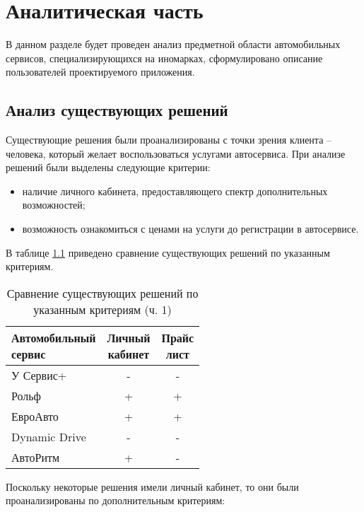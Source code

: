 \chapter{Аналитическая часть}

В данном разделе будет проведен анализ предметной области автомобильных сервисов, специализирующихся на иномарках, сформулировано описание пользователей проектируемого приложения.

\section{Анализ существующих решений}

Существующие решения были проанализированы с точки зрения клиента -- человека, который желает воспользоваться услугами автосервиса. При анализе решений были выделены следующие критерии:

\begin{itemize}
	\item наличие личного кабинета, предоставляющего спектр дополнительных возможностей;
	\item возможность ознакомиться с ценами на услуги до регистрации в автосервисе.
\end{itemize}

В таблице \ref{tab:compare1} приведено сравнение существующих решений по указанным критериям.

\begin{table}[H]
	\centering
	\caption{\label{tab:compare1}Сравнение существующих решений по указанным критериям (ч. 1)}
	\begin{tabular}{|l|c|c|}
		\hline \specialcell{Автомобильный\\сервис} & \specialcell{Личный\\кабинет} &
		\specialcell{Прайс\\лист} \\\hline
		У Сервис+ \cite{serv1} & - & - \\\hline
		Рольф \cite{serv2} & + & + \\\hline
		ЕвроАвто \cite{serv3} & + & + \\\hline
		Dynamic Drive \cite{serv4} & - & - \\\hline
		АвтоРитм \cite{serv5} & + & - \\\hline
	\end{tabular}
\end{table}

Поскольку некоторые решения имели личный кабинет, то они были проанализированы по дополнительным критериям:

